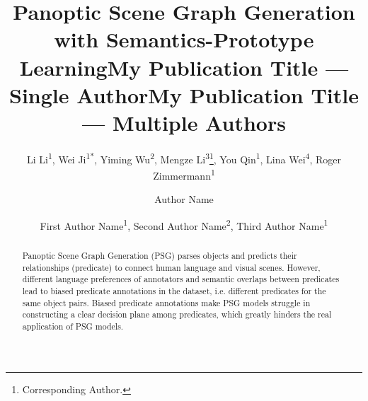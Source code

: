 \documentclass[letterpaper]{article} %
\title{Panoptic Scene Graph Generation with Semantics-Prototype Learning}
\author{
    Li Li\textsuperscript{\rm 1},
    Wei Ji\textsuperscript{\rm 1}\textsuperscript{*},
    Yiming Wu\textsuperscript{\rm 2},
    Mengze Li\textsuperscript{\rm 3}\thanks{Corresponding Author.},
    You Qin\textsuperscript{\rm 1},
    Lina Wei\textsuperscript{\rm 4},
    Roger Zimmermann\textsuperscript{\rm 1}
}
\title{My Publication Title --- Single Author}
\author {
    Author Name
}
\title{My Publication Title --- Multiple Authors}
\author {
    First Author Name\textsuperscript{\rm 1},
    Second Author Name\textsuperscript{\rm 2},
    Third Author Name\textsuperscript{\rm 1}
}
\begin{document}
\maketitle

\begin{abstract}
Panoptic Scene Graph Generation (PSG) parses objects and predicts their relationships (predicate) to connect human language and visual scenes.
However, different language preferences of annotators and semantic overlaps between predicates lead to biased predicate annotations in the dataset, i.e. different predicates for the same object pairs.
Biased predicate annotations make PSG models struggle in constructing a clear decision plane among predicates, which greatly hinders the real application of PSG models.

\end{abstract}
\end{document}
